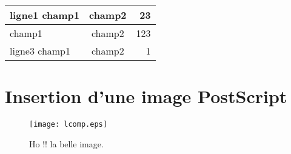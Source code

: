 \documentclass[12pt]{article}    %
\begin{document}
\begin{center}
\begin{tabular}{|l|c||r|} \hline                                
ligne1 champ1 & champ2  & 23   \\ \hline
champ1        & champ2  & 123  \\ \hline
ligne3 champ1 & champ2  & 1    \\ \hline
\end{tabular}
\end{center}

\section{Insertion d'une image PostScript}               %

\begin{figure}[h]
\centerline{\texttt{[image: lcomp.eps]}}
\caption{Ho !! la belle image.}
\end{figure}
\end{document}
